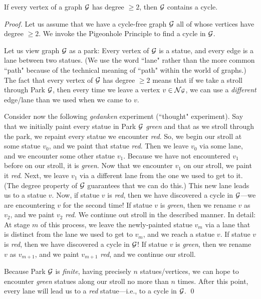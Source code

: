 \begin{prop}
\label{thm:cycle-in-graph}
If every vertex of a graph $\mbox{$\cal G$}$ has degree $\geq 2$, then $\mbox{$\cal G$}$ contains a cycle.
\end{prop}

\begin{proof}
Let us assume that we have a cycle-free graph $\mbox{$\cal G$}$ all of whose vertices have degree $\geq 2$.  We invoke the Pigeonhole Principle to find a cycle in $\mbox{$\cal G$}$.

\smallskip

Let us view graph $\mbox{$\cal G$}$ as a park:  Every vertex of $\mbox{$\cal G$}$ is a statue, and every edge is a lane between two statues.  (We use the word ``lane" rather than the more common ``path"  because of the technical meaning of ``path" within the world of graphs.)   The fact that every vertex of $\mbox{$\cal G$}$ has degree $\geq 2$ means that if we take a stroll through Park $\mbox{$\cal G$}$, then every time we leave a vertex $v \in \mbox{$\cal N$}{\mbox{{\scriptsize $\cal G$}}}$, we can use a {\em different} edge/lane than we used when we came to $v$.

\smallskip


Consider now the following {\em gedanken} experiment (``thought" experiment).  Say that we initially paint every statue in Park $\mbox{$\cal G$}$ {\em green} and that as we stroll through the park, we repaint every statue we encounter {\em red}.  So, we begin our stroll at some statue $v_0$, and we paint that statue {\em red}.  Then we  leave $v_0$ via some lane, and we encounter some other statue $v_1$.  Because we have not encountered $v_1$ before on our stroll, it is {\em green}.  Now that we encounter $v_1$ on our stroll, we paint it {\em red}.  Next, we leave $v_1$ via a different lane from the one we used to get to it.  (The degree property of $\mbox{$\cal G$}$ guarantees that we can do this.)  This new lane leads us to a statue $v$.  Now, if statue $v$ is {\em red}, then we have discovered a cycle in $\mbox{$\cal G$}$---we are encountering $v$ for the second time!  If statue $v$ is {\em green}, then we rename $v$ as $v_2$, and we paint $v_2$ {\em red}.  We continue out stroll in the described manner.  In detail: At stage $m$ of this process, we leave the 
newly-painted statue $v_m$ via a lane that is distinct from the lane we used to get to $v_m$, 
and we reach a statue $v$.  If statue $v$ is {\em red}, then we have discovered a cycle in $\mbox{$\cal G$}$!
If statue $v$ is {\em green}, then we rename $v$ as $v_{m+1}$, and we paint $v_{m+1}$ {\em red}, and we continue our stroll.

\smallskip

Because Park $\mbox{$\cal G$}$ is {\em finite}, having precisely $n$ statues/vertices, we can hope to encounter {\em green} statues along our stroll no more than $n$ times.  After this point, every lane will lead us to a {\em red} statue---i.e., to a cycle in $\mbox{$\cal G$}$.  \qed
\end{proof}

